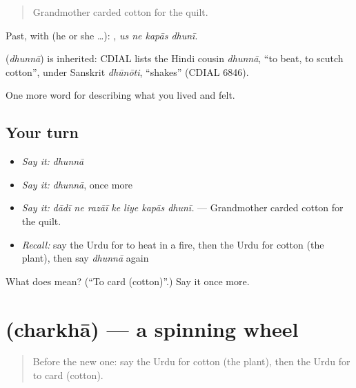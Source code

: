 \begin{quote}
Grandmother carded cotton for the quilt.
\end{quote}

Past, with  (he or she …):    , \emph{us ne kapās dhunī}.

\begin{cousinweb}
\textbf{} (\emph{dhunnā}) is inherited: CDIAL lists the Hindi cousin \emph{dhunnā}, \textquotedblleft{}to beat, to scutch cotton\textquotedblright{}, under Sanskrit \emph{dhūnōti}, \textquotedblleft{}shakes\textquotedblright{} (CDIAL 6846).
\end{cousinweb}

\begin{grammarlens}[title={What you've built}]
One more word for describing what you lived and felt.
\end{grammarlens}

\subsection*{Your turn}
\begin{itemize}
\raggedright
  \item \emph{Say it:} \emph{dhunnā}
  \item \emph{Say it:} \emph{dhunnā}, once more
  \item \emph{Say it:} \emph{dādī ne razāī ke liye kapās dhunī.} — Grandmother carded cotton for the quilt.
  \item \emph{Recall:} say the Urdu for to heat in a fire, then the Urdu for cotton (the plant), then say \emph{dhunnā} again
\end{itemize}

\begin{tcolorbox}[breakable,colback=teal!4,colframe=teal!35!black,title={Before you move on}]
What does  mean? (\textquotedblleft{}To card (cotton)\textquotedblright{}.) Say it once more.
\end{tcolorbox}
\section[\texorpdfstring{\ur{چرخہ} (charkhā)}{چرخہ (charkhā)}]{ (charkhā) — a spinning wheel}

\label{lesson:UR-C499-charkha}



\begin{quote}
Before the new one: say the Urdu for cotton (the plant), then the Urdu for to card (cotton).
\end{quote}

